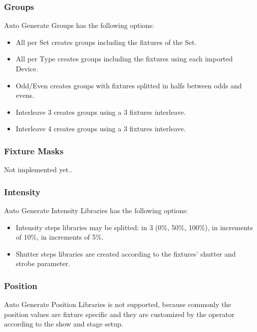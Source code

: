 \documentclass[
]{article}
\begin{document}
\hypertarget{groups}{%
\subsubsection{Groups}\label{groups}}

Auto Generate Groups has the following options:

\begin{itemize}
\item
  All per Set creates groups including the fixtures of the Set.
\item
  All per Type creates groups including the fixtures using each imported Device.
\item
  Odd/Even creates groups with fixtures splitted in halfs between odds and evens.
\item
  Interleave 3 creates groups using a 3 fixtures interleave.
\item
  Interleave 4 creates groups using a 3 fixtures interleave.
\end{itemize}

\hypertarget{fixture-masks}{%
\subsubsection{Fixture Masks}\label{fixture-masks}}

{Not implemented yet.}.

\hypertarget{intensity-1}{%
\subsubsection{Intensity}\label{intensity-1}}

Auto Generate Intensity Libraries has the following options:

\begin{itemize}
\item
  Intensity steps libraries may be splitted: in 3 (0\%, 50\%, 100\%), in increments of 10\%, in increments of 5\%.
\item
  Shutter steps libraries are created according to the fixtures' shutter and strobe parameter.
\end{itemize}

\hypertarget{position-1}{%
\subsubsection{Position}\label{position-1}}

Auto Generate Position Libraries is not supported, because commonly the position values are fixture specific and they are customized by the operator according to the show and stage setup.
\end{document}
